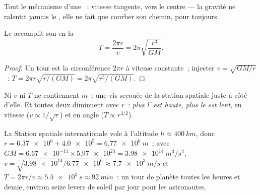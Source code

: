 \begin{omfigure}

{\small Tout le mécanisme d'une ~: vitesse tangente, 
vers le centre --- la gravité ne ralentit jamais le , elle
ne fait que courber son chemin, pour toujours.}
\end{omfigure}

\begin{proposition}\label{prop:g12:satellites-kepler:period}
Le  accomplit son
 en la 
\[ T = \frac{2\pi r}{v} = 2\pi \sqrt{\frac{r^3}{G M}}. \]
\end{proposition}

\begin{proof}
Un tour est la circonférence $2\pi r$ à vitesse constante~; injecter
$v = \sqrt{GM/r}$~: $T = 2\pi r\sqrt{r/(GM)} = 2\pi\sqrt{r^3/(GM)}$.
\end{proof}

Ni $v$ ni $T$ ne contiennent $m$~: une vis secouée de la station
spatiale  juste à côté d'elle. Et toutes deux
diminuent avec $r$~: \emph{plus l' est haute,
plus le  est lent}, en vitesse
($v \propto 1/\sqrt r$) et en angle ($T \propto r^{3/2}$).

\begin{example}\label{ex:g12:satellites-kepler:iss}
La Station spatiale internationale vole à l'altitude
$h \approx \qty{400}{km}$, donc $r = \num{6.37e6} + \num{4.0e5} =
\qty{6.77e6}{m}$~; avec $GM = \num{6.67e-11} \times \num{5.97e24} =
\qty{3.98e14}{m^3/s^2}$, $v = \sqrt{\num{3.98e14}/\num{6.77e6}}
\approx \qty{7.7e3}{m/s}$ et $T = 2\pi r/v \approx \qty{5.5e3}{s}
\approx \qty{92}{min}$~: un tour de planète toutes les heures et demie,
environ seize levers de soleil par jour pour les astronautes.
\end{example}

